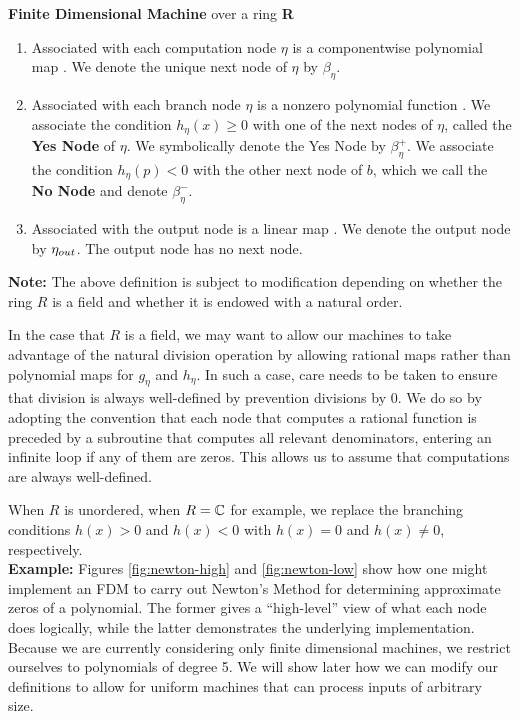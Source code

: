 \begin{definition}{\textbf{Finite Dimensional Machine} over a ring
    \textbf{R}}
\begin{enumerate}
  \item Associated with each computation node $\eta$ is a
    componentwise polynomial map
    . We denote the
    unique next node of $\eta$ by $\beta_\eta$.
    
  \item Associated with each branch node $\eta$ is a nonzero
    polynomial function .  We
    associate the condition $h_\eta(x) \geq 0$ with one of the next
    nodes of $\eta$, called the \textbf{Yes Node} of $\eta$.  We
    symbolically denote the Yes Node by $\beta_\eta^+$. We associate
    the condition $h_\eta(p) < 0$ with the other next node of $b$,
    which we call the \textbf{No Node} and denote $\beta_\eta^-$.
    
  \item Associated with the output node is a linear map
    .  We denote the output
    node by $\eta_{out}$.  The output node has no next node.
  \end{enumerate}
\end{definition}

\textbf{Note: }The above definition is subject to modification
depending on whether the ring $R$ is a field and whether it is endowed
with a natural order.  

In the case that $R$ is a field, we may want to
allow our machines to take advantage of the natural division operation
by allowing rational maps rather than polynomial maps for $g_\eta$ and
$h_\eta$.  In such a case, care needs to be taken to ensure that
division is always well-defined by prevention divisions by $0$.  We do
so by adopting the convention that each node that computes a rational
function is preceded by a subroutine that computes all relevant
denominators, entering an infinite loop if any of them are zeros.
This allows us to assume that computations are always well-defined.

When $R$ is unordered, when $R = \mathbb{C}$ for example, we replace
the branching conditions $h(x) > 0$ and $h(x) < 0$ with $h(x) = 0$ and
$h(x) \neq 0$, respectively.\\

\textbf{Example: } Figures \ref{fig:newton-high} and
\ref{fig:newton-low} show how one might implement an FDM to carry out
Newton's Method for determining approximate zeros of a polynomial.
The former gives a ``high-level'' view of what each node does
logically, while the latter demonstrates the underlying
implementation. Because we are currently considering only finite
dimensional machines, we restrict ourselves to polynomials of degree
5.  We will show later how we can modify our definitions to allow for
uniform machines that can process inputs of arbitrary size.

